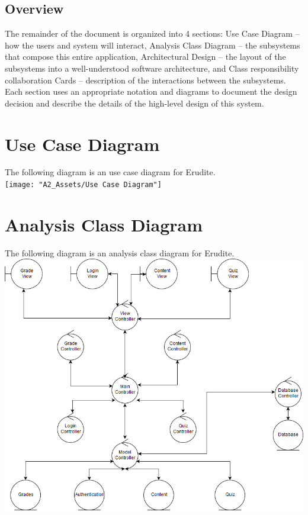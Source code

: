 \documentclass[]{article}
\begin{document}
\subsection{Overview}
\label{sub:overview}
The remainder of the document is organized into 4 sections: Use Case Diagram --
how the users and system will interact, Analysis Class Diagram -- the
subsystems that compose this entire application, Architectural Design -- the
layout of the subsystems into a well-understood software architecture, and
Class responsibility collaboration Cards -- description of the interactions
between the subsystems. Each section uses an appropriate notation and diagrams
to document the design decision and describe the details of the high-level
design of this system.




\newpage

\section{Use Case Diagram}
\label{sec:use_case_diagram}
The following diagram is an use case diagram for Erudite.\\

{
  \centering
  \texttt{[image: "A2\_Assets/Use Case Diagram"]}
}

\newpage

\section{Analysis Class Diagram}
\label{sec:analysis_class_diagram}
The following diagram is an analysis class diagram for Erudite.\\

{
  \centering
  \includegraphics[scale=0.5]{A2_Assets/Analysis_Class_Diagrm_v2.jpg}
}
\end{document}

